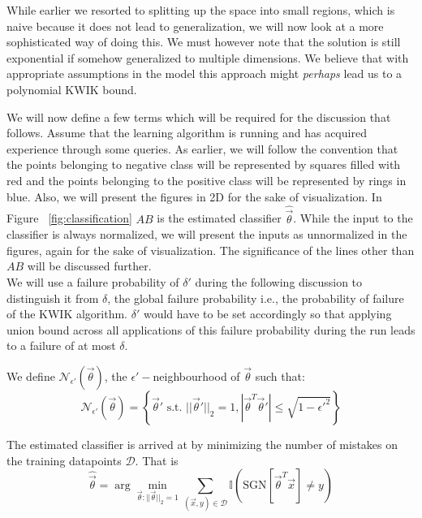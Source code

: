 While earlier we resorted to splitting up the space into small regions, which is naive because it does not lead to generalization, we will now look at a more sophisticated way of doing this. We must however note that the solution is still exponential if somehow generalized to multiple dimensions. We believe that with appropriate assumptions in the model this approach might \textit{perhaps} lead us to a polynomial KWIK bound. 


We will now define a few terms which will be required for the discussion that follows. Assume that the learning algorithm is running  and has acquired experience through some queries. As earlier, we will follow the convention that the points belonging to negative class will be represented by {\color{red} squares filled with red} and the points belonging to the positive class will be represented by {\color{blue} rings in blue.} Also, we will present the figures in 2D for the sake of visualization. In Figure ~\ref{fig:classification} $AB$ is the estimated classifier $\hat{\vec{\theta}}$. While the input to the classifier is always normalized, we will present the inputs as unnormalized in the figures, again for the sake of visualization. The significance of  the lines other than $AB$ will be discussed further. \\

We will use a failure probability of $\delta'$ during the following discussion to distinguish it from $\delta$, the global failure probability i.e., the probability of failure of the KWIK algorithm.  $\delta'$ would have to be set accordingly so that applying union bound across all applications of this failure probability during the run leads to a failure of at most $\delta$.

\begin{dfn}
We define $\mathcal{N}_{\epsilon'}(\vec{\theta})$, the $\epsilon'-$neighbourhood of $\vec{\theta}$ such  that:
\begin{equation}
\mathcal{N}_{\epsilon'}(\vec{\theta}) = \left\lbrace \vec{\theta}' \text{ s.t. } ||\vec{\theta}'||_2=1, | \vec{\theta}^T \vec{\theta}' | \leq \sqrt{1-\epsilon'^2} \right\rbrace
\end{equation}
 
\end{dfn}


\begin{assumption}
\label{ass:objective}
The estimated classifier is arrived at by minimizing the number of mistakes on the training datapoints $\mathcal{D}$.
That is 
\begin{equation}
\hat{\vec{\theta}} = \arg \min_{\vec{\theta}: ||\vec{\theta}||_2=1} \displaystyle\sum\limits_{(\vec{x},y) \in \mathcal{D}} \mathbb{I}\left( \text{SGN}[\vec{\theta}^T \vec{x}] \neq y \right)
\end{equation}
\end{assumption}



